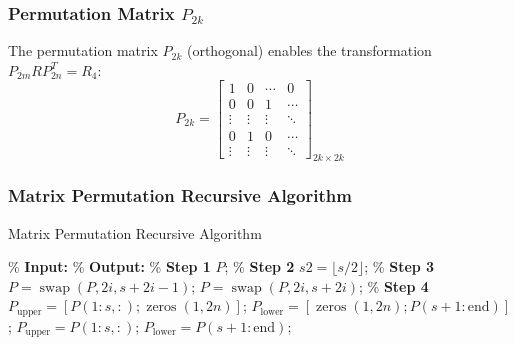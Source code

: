 \documentclass{beamer}
\begin{document}
\begin{frame}
    \frametitle{Permutation Matrix \( P_{2k} \)}
    The permutation matrix \( P_{2k} \) (orthogonal) enables the transformation \( P_{2m} R P_{2n}^T = R_4 \):
    \[
    P_{2k} = \begin{bmatrix} 
    1 & 0 & \cdots & 0 \\ 
    0 & 0 & 1 & \cdots \\ 
    \vdots & \vdots & \vdots & \ddots \\ 
    0 & 1 & 0 & \cdots \\ 
    \vdots & \vdots & \vdots & \ddots 
    \end{bmatrix}_{2k \times 2k}
    \]
\end{frame}
\iffalse
\begin{frame}
\frametitle{Matrix Permutation Recursive Algorithm}
    \small %
    \begin{algorithm}[H] %
    \caption{Matrix Permutation Recursive Algorithm} \label{alg:Permutation}
    \begin{algorithmic}[1]
        \State \% \textbf{Input:} 
        \State \% \textbf{Output:} 
        \State
        \State \% \textbf{Step 1} 
            \State \Return $P$;
        \EndIf %
        \State
        \State \% \textbf{Step 2} 
        \State $s2 = \lfloor s/2 \rfloor$; %
        \State
        \State \% \textbf{Step 3} 
                \State $P = \operatorname{swap}(P, 2i, s+2i-1)$; %
            \Else
                \State $P = \operatorname{swap}(P, 2i, s+2i)$;
            \EndIf %
        \EndFor %
        \State
        \State \% \textbf{Step 4} 
            \State $P_{\text{upper}} = [P(1:s,:); \operatorname{zeros}(1, 2n)]$;
            \State $P_{\text{lower}} = [\operatorname{zeros}(1, 2n); P(s+1:\text{end})]$;
        \Else
            \State $P_{\text{upper}} = P(1:s,:)$;
            \State $P_{\text{lower}} = P(s+1:\text{end})$;

\end{algorithmic}
\end{algorithm}
\end{frame}
\end{document}
